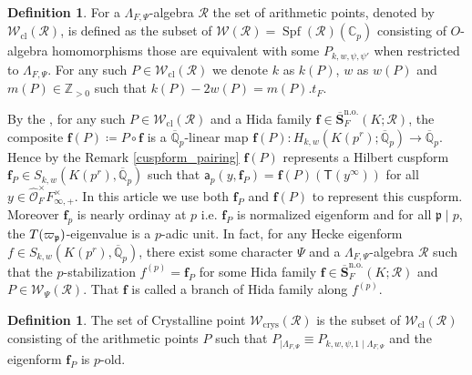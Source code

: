\documentclass[10pt]{amsart}
\numberwithin{equation}{section}
\theoremstyle{definition}
\newtheorem{defn}[thm]{Definition}
\theoremstyle{remark} %
\newcommand{\bb}{\mathbb}
\newcommand{\mbf}{\mathbf}
\newcommand{\msf}{\mathsf}
\newcommand{\mrm}{\mathrm}
\newcommand{\f}{\mathbf{f}}
\newcommand{\Oo}{\mathcal{O}}
\newcommand{\p}{\mathfrak{p}}
\newcommand{\Q}{\mathbb{Q}}
\newcommand{\R}{\mathcal{R}}
\newcommand{\W}{\mathcal{W}}
\newcommand{\Z}{\mathbb{Z}}
\begin{document}
	\begin{defn}
		For  a $\Lambda_{F,\Psi}$-algebra $\R$ the set of arithmetic points, denoted by $\W_{\mrm{cl}}(\R)$, is defined as the subset of $\W(\R) = \operatorname{Spf}(\R)(\bb{C}_p)$ consisting of $ O $-algebra homomorphisms those are equivalent with some $P_{k,w,\psi,\psi'}$ when restricted to $\Lambda_{F,\Psi}$. For any such $ P \in \W_{\mrm{cl}}(\R) $ we denote $ k $ as $ k(P) $, $ w $ as $ w(P) $ and $ m(P) \in \Z_{>0} $ such that $ k(P)-2w(P)=m(P).t_F $. %
	\end{defn}
	By the \cite[Theorem 2.4]{hida89nearly}, for any such $ P \in \W_{\mrm{cl}}(\R) $ and a Hida family $ \f \in \overline{\mbf{S}}_F^\mrm{n.o.}(K;\R) $, the composite $ \f(P) \coloneqq P \circ \f $ is a $ \overline{\Q}_p $-linear map $ \f(P) \colon  H_{k,w}(K(p^r); \overline{\Q}_p ) \rightarrow \overline{\Q}_p $. Hence by the Remark \ref{cuspform_pairing} $ \f(P) $ represents a Hilbert cuspform $ \f_P \in S_{k,w}(K(p^r),\overline{\Q}_p) $ such that $ \msf{a}_p(y,\f_P) = \f(P)(\msf{T}(y^\infty)) $ for all $ y \in \widehat{\Oo}_F^\times F^\times_{\infty, +} $. In this article we use both $ \f_P $ and $ \f(P) $ to represent this cuspform. Moreover $ \f_p $ is nearly ordinay at $ p $ i.e. $ \f_P $ is normalized eigenform and for all $ \p \mid p$, the $ T(\varpi_{\frak{p}}) $-eigenvalue is a $ p $-adic unit. In fact, for any Hecke eigenform $ f \in S_{k,w}(K(p^r),\overline{\Q}_p) $, there exist some character $ \Psi  $ and a $ \Lambda_{F,\Psi} $-algebra $ \R $ such that the $ p $-stabilization $ f^{(p)} = \f_P $ for some Hida family $ \f \in \overline{\mbf{S}}_F^\mrm{n.o.}(K;\R) $ and $ P \in \W_\Psi(\R) $. That $ \f $ is called a branch of Hida family along $ f^{(p)} $.
	\begin{defn}
		The set of Crystalline point $\W_{\mrm{crys}}(\R)$ is the subset of $ \W_{\mrm{cl}}(\R) $ consisting of the arithmetic points $ P $ such that $ P_{\mid \Lambda_{F,\Psi}} \equiv P_{k,w,\psi,1\mid \Lambda_{F,\Psi}} $ and the eigenform $ \f_P $ is $ p $-old. 
	\end{defn}   
	
\end{document}
